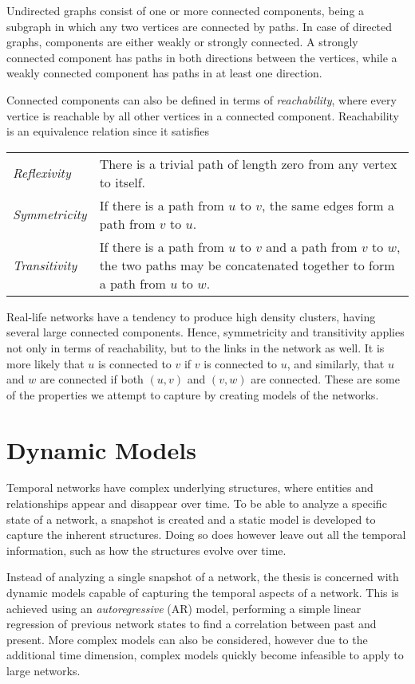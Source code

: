     Undirected graphs consist of one or more connected components, being a subgraph in which any two vertices are connected by paths. 
    In case of directed graphs, components are either weakly or strongly connected. A strongly connected component has paths in both directions between the vertices, while a weakly connected component has paths in at least one direction. 
    
    Connected components can also be defined in terms of \emph{reachability}, where every vertice is reachable by all other vertices in a connected component. Reachability is an equivalence relation since it satisfies
    \par\begin{tabular}{>{\itshape}l p{}}
        Reflexivity  & There is a trivial path of length zero from any vertex to itself. \\
        Symmetricity & If there is a path from $u$ to $v$, the same edges form a path from $v$ to $u$. \\
        Transitivity & If there is a path from $u$ to $v$ and a path from $v$ to $w$, the two paths may be concatenated together to form a path from $u$ to $w$.
    \end{tabular}
    
    Real-life networks have a tendency to produce high density clusters, having several large connected components. Hence, symmetricity and transitivity applies not only in terms of reachability, but to the links in the network as well. It is more likely that $u$ is connected to $v$ if $v$ is connected to $u$, and similarly, that $u$ and $w$ are connected if both $(u,v)$ and $(v,w)$ are connected. These are some of the properties we attempt to capture by creating models of the networks.

\section{Dynamic Models}

    Temporal networks have complex underlying structures, where entities and relationships appear and disappear over time. To be able to analyze a specific state of a network, a snapshot is created and a static model is developed to capture the inherent structures.
    Doing so does however leave out all the temporal information, such as how the structures evolve over time.
    
    Instead of analyzing a single snapshot of a network, the thesis is concerned with dynamic models capable of capturing the temporal aspects of a network. This is achieved using an \emph{autoregressive} (AR) model, performing a simple linear regression of previous network states to find a correlation between past and present. More complex models can also be considered, however due to the additional time dimension, complex models quickly become infeasible to apply to large networks.
    
